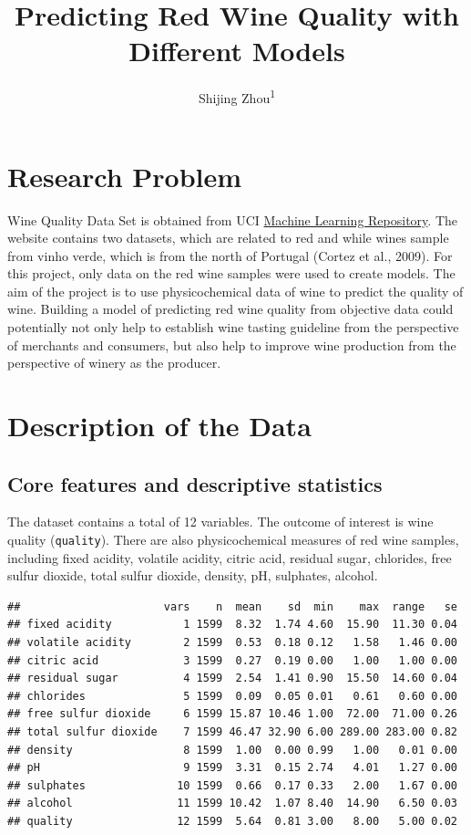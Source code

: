 \documentclass[
  english,
  man]{apa6}
\title{Predicting Red Wine Quality with Different Models}
\author{Shijing Zhou\textsuperscript{1}}
\date{}
\affiliation{\vspace{0.5cm}\textsuperscript{1} University of Oregon}
\begin{document}
\maketitle

\hypertarget{research-problem}{%
\section{Research Problem}\label{research-problem}}

Wine Quality Data Set is obtained from UCI \href{https://archive.ics.uci.edu/ml/datasets/wine+quality}{Machine Learning Repository}. The website contains two datasets, which are related to red and while wines sample from vinho verde, which is from the north of Portugal (Cortez et al., 2009). For this project, only data on the red wine samples were used to create models. The aim of the project is to use physicochemical data of wine to predict the quality of wine. Building a model of predicting red wine quality from objective data could potentially not only help to establish wine tasting guideline from the perspective of merchants and consumers, but also help to improve wine production from the perspective of winery as the producer.

\hypertarget{description-of-the-data}{%
\section{Description of the Data}\label{description-of-the-data}}

\hypertarget{core-features-and-descriptive-statistics}{%
\subsection{Core features and descriptive statistics}\label{core-features-and-descriptive-statistics}}

The dataset contains a total of 12 variables. The outcome of interest is wine quality (\texttt{quality}). There are also physicochemical measures of red wine samples, including fixed acidity, volatile acidity, citric acid, residual sugar, chlorides, free sulfur dioxide, total sulfur dioxide, density, pH, sulphates, alcohol.

\begin{verbatim}
##                      vars    n  mean    sd  min    max  range   se
## fixed acidity           1 1599  8.32  1.74 4.60  15.90  11.30 0.04
## volatile acidity        2 1599  0.53  0.18 0.12   1.58   1.46 0.00
## citric acid             3 1599  0.27  0.19 0.00   1.00   1.00 0.00
## residual sugar          4 1599  2.54  1.41 0.90  15.50  14.60 0.04
## chlorides               5 1599  0.09  0.05 0.01   0.61   0.60 0.00
## free sulfur dioxide     6 1599 15.87 10.46 1.00  72.00  71.00 0.26
## total sulfur dioxide    7 1599 46.47 32.90 6.00 289.00 283.00 0.82
## density                 8 1599  1.00  0.00 0.99   1.00   0.01 0.00
## pH                      9 1599  3.31  0.15 2.74   4.01   1.27 0.00
## sulphates              10 1599  0.66  0.17 0.33   2.00   1.67 0.00
## alcohol                11 1599 10.42  1.07 8.40  14.90   6.50 0.03
## quality                12 1599  5.64  0.81 3.00   8.00   5.00 0.02
\end{verbatim}
\end{document}
